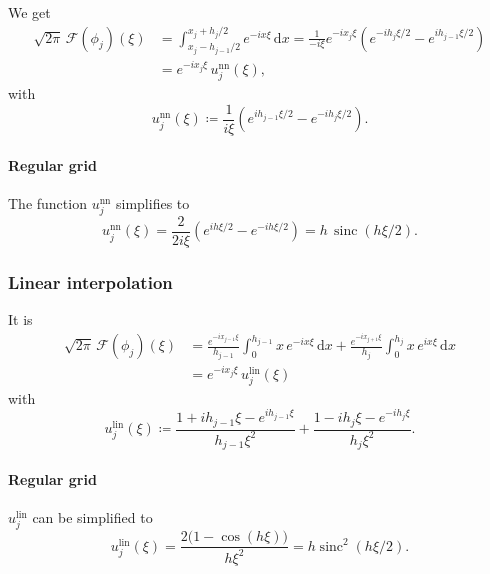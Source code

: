 \documentclass[a4paper]{paper}
\newcommand*{\OP}[1]{{\ensuremath{\mathcal{#1}}}}
\newcommand*{\FT}{\OP{F}}
\DeclareMathOperator{\SINC}{{sinc}}
\DeclareMathOperator{\DEFEQ}{{\coloneqq}}
\newcommand*{\I}{\ensuremath{\mathit{i}}}
\newcommand*{\D}{{\ensuremath{\mathrm{d}}}}
\begin{document}
We get
%
\begin{align*}
 \sqrt{2\pi}\, \FT(\phi_j)(\xi)
 &= \int_{x_j - h_{j-1}/2}^{x_j + h_j/2} e^{-\I x\xi}\, \D x
 = \frac{1}{-\I\xi} e^{-\I x_j \xi} (e^{-\I h_j\xi/2} - e^{\I h_{j-1}\xi/2}) \\
 &= e^{-\I x_j \xi}\, u_j^{\mathrm{nn}}(\xi),
\end{align*}
%
with
%
\begin{equation*}
 u_j^{\mathrm{nn}}(\xi) \DEFEQ \frac{1}{\I\xi} (e^{\I h_{j-1}\xi/2} - e^{-\I h_j\xi/2}).
\end{equation*}

\paragraph{Regular grid} 

The function $u_j^{\mathrm{nn}}$ simplifies to
%
\begin{equation*}
 u_j^{\mathrm{nn}}(\xi) = \frac{2}{2\I\xi}(e^{\I h\xi/2} - e^{-\I h\xi/2}) = h\, \SINC(h\xi/2).
\end{equation*}


\subsubsection{Linear interpolation}
\label{subsubsec:specif:fourier:linear}

It is
%
\begin{align*}
 \sqrt{2\pi}\, \FT(\phi_j)(\xi)
 &= \frac{e^{-\I x_{j-1} \xi}}{h_{j-1}} \int_0^{h_{j-1}} x\, e^{-\I x\xi}\, \D x +
 \frac{e^{-\I x_{j+1} \xi}}{h_j} \int_0^{h_j} x\, e^{\I x\xi}\, \D x \\
 &= e^{-\I x_j \xi}\, u_j^{\mathrm{lin}}(\xi)
\end{align*}
%
with
%
\begin{equation*}
 u_j^{\mathrm{lin}}(\xi) \DEFEQ \frac{1 + \I h_{j-1}\xi - e^{\I h_{j-1}\xi}}{h_{j-1} \xi^2} +
 \frac{1 - \I h_j\xi - e^{-\I h_j\xi}}{h_j \xi^2}.
\end{equation*}

\paragraph{Regular grid} 

$u_j^{\mathrm{lin}}$ can be simplified to
%
\begin{equation*}
 u_j^{\mathrm{lin}}(\xi) = \frac{2\big( 1-\cos(h\xi) \big)}{h\xi^2} = h \SINC^2(h\xi/2).
\end{equation*}
\end{document}
